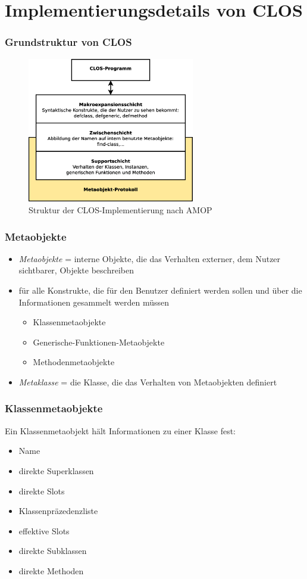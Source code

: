 \documentclass{beamer}
\begin{document}
\section{Implementierungsdetails von CLOS}
\frame{\tableofcontents[currentsection]}
\begin{frame}
 \frametitle{Grundstruktur von CLOS}
 \begin{figure}
  \includegraphics[width=0.65\textwidth]{pictures/mop}
  \caption{Struktur der CLOS-Implementierung nach AMOP}
 \end{figure}
\end{frame}

\begin{frame}
 \frametitle{Metaobjekte}
 \begin{itemize}
  \item \emph{Metaobjekte} = interne Objekte, die das Verhalten externer, dem Nutzer sichtbarer, Objekte beschreiben 
  \item für alle Konstrukte, die für den Benutzer definiert werden sollen und über die Informationen gesammelt werden müssen
  \begin{itemize}
   \item Klassenmetaobjekte
   \item Generische-Funktionen-Metaobjekte
   \item Methodenmetaobjekte
  \end{itemize}
  \item \emph{Metaklasse} = die Klasse, die das Verhalten von Metaobjekten definiert 
 \end{itemize}
\end{frame}

\begin{frame}[fragile]
 \frametitle{Klassenmetaobjekte}
 Ein Klassenmetaobjekt hält Informationen zu einer Klasse fest:
 \begin{itemize}
  \item Name
  \item direkte Superklassen
  \item direkte Slots
  \item Klassenpräzedenzliste
  \item effektive Slots
  \item direkte Subklassen
  \item direkte Methoden
 \end{itemize}
\end{frame}
\end{document}
